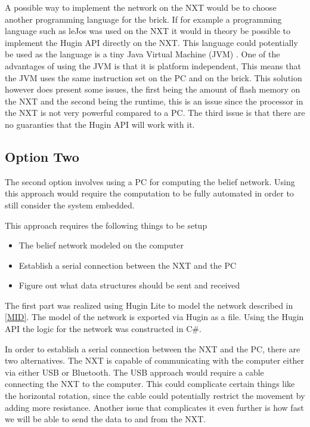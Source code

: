 A possible way to implement the network on the NXT would be to choose another
programming language for the brick. If for example a programming language such
as leJos was used on the NXT it would in theory be possible to implement the
Hugin API directly on the NXT. This language could potentially be used as the
language is a tiny Java Virtual Machine (JVM) \cite{LeJos}. One of the
advantages of using the JVM is that it is platform independent, This means
that the JVM uses the same instruction set on the PC and on the brick. This
solution however does present some issues, the first being the amount of flash
memory on the NXT and the second being the runtime, this is an issue since the
processor in the NXT is not very powerful compared to a PC.
The third issue is that there are no guaranties that the Hugin API will work with it.


\subsection{Option Two}
The second option involves using a PC for computing the
belief network. Using this approach would require the computation to be fully
automated in order to still consider the system embedded.\nl

This approach requires the following things to be setup
\begin{itemize}
\item The belief network modeled on the computer
\item Establish a serial connection between the NXT and the PC
\item Figure out what data structures should be sent and received
\end{itemize}

The first part was realized using Hugin Lite to model the network described
in \autoref{MID}. The model of the network is exported via Hugin as a file.
Using the Hugin API the logic for the network was constructed in C\#.\nl

In order to establish a serial connection between the NXT and the PC, there are
two alternatives. The NXT is capable of communicating with the computer either
via either USB or Bluetooth. The USB approach would require a cable connecting
the NXT to the computer.
This could complicate certain things like the horizontal rotation, since the
cable could potentially restrict the movement by adding more resistance.
Another issue that complicates it even further is how fast we will be able to
send the data to and from the NXT.\nl

